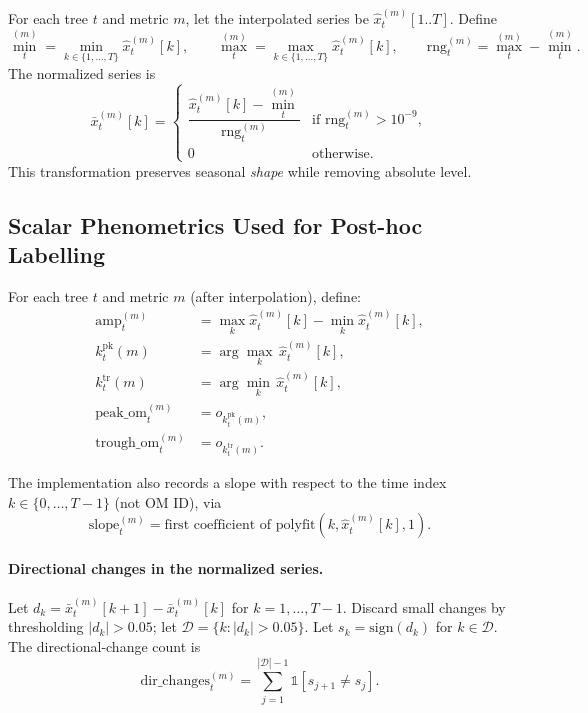 \documentclass{article}
\begin{document}
For each tree $t$ and metric $m$, let the interpolated series be $\hat{x}^{(m)}_{t}[1..T]$.
Define
\begin{equation}
\min_t^{(m)}=\min_{k\in\{1,\dots,T\}} \hat{x}^{(m)}_{t}[k],
\qquad
\max_t^{(m)}=\max_{k\in\{1,\dots,T\}} \hat{x}^{(m)}_{t}[k],
\qquad
\mathrm{rng}_t^{(m)}=\max_t^{(m)}-\min_t^{(m)}.
\end{equation}
The normalized series is
\begin{equation}
\bar{x}^{(m)}_{t}[k] =
\begin{cases}
\dfrac{\hat{x}^{(m)}_{t}[k]-\min_t^{(m)}}{\mathrm{rng}_t^{(m)}} & \text{if } \mathrm{rng}_t^{(m)} > 10^{-9},\\
0 & \text{otherwise.}
\end{cases}
\end{equation}
This transformation preserves seasonal \emph{shape} while removing absolute level.

\subsection{Scalar Phenometrics Used for Post-hoc Labelling}

For each tree $t$ and metric $m$ (after interpolation), define:
\begin{align}
\mathrm{amp}_t^{(m)} &= \max_{k} \hat{x}^{(m)}_t[k] - \min_{k} \hat{x}^{(m)}_t[k],\\
k^{\mathrm{pk}}_t(m) &= \arg\max_{k}\,\hat{x}^{(m)}_t[k],\\
k^{\mathrm{tr}}_t(m) &= \arg\min_{k}\,\hat{x}^{(m)}_t[k],\\
\mathrm{peak\_om}_t^{(m)} &= o_{k^{\mathrm{pk}}_t(m)},\\
\mathrm{trough\_om}_t^{(m)} &= o_{k^{\mathrm{tr}}_t(m)}.
\end{align}

The implementation also records a slope with respect to the time index $k\in\{0,\dots,T-1\}$ (not OM ID), via
\begin{equation}
\mathrm{slope}_t^{(m)} = \text{first coefficient of } \mathrm{polyfit}(k,\hat{x}^{(m)}_t[k],1).
\end{equation}

\paragraph{Directional changes in the normalized series.}
Let $d_k = \bar{x}^{(m)}_t[k+1]-\bar{x}^{(m)}_t[k]$ for $k=1,\dots,T-1$.
Discard small changes by thresholding $|d_k|>0.05$; let $\mathcal{D}=\{k: |d_k|>0.05\}$.
Let $s_k=\mathrm{sign}(d_k)$ for $k\in\mathcal{D}$.
The directional-change count is
\begin{equation}
\mathrm{dir\_changes}_t^{(m)} = \sum_{j=1}^{|\mathcal{D}|-1} \mathbb{1}[s_{j+1}\ne s_j].
\end{equation}
\end{document}
